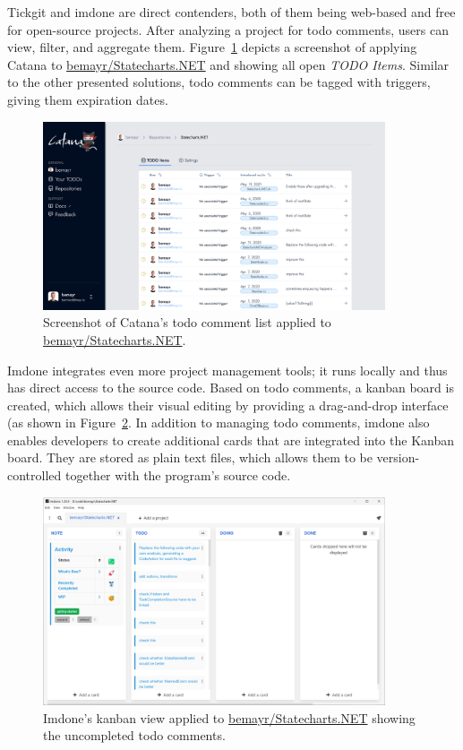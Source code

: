 Tickgit and imdone are direct contenders, both of them being web-based and free for open-source projects.
After analyzing a project for todo comments, users can view, filter, and aggregate them.
Figure~\ref{fig:catana} depicts a screenshot of applying Catana to \href{https://github.com/bemayr/Statecharts.NET}{bemayr/Statecharts.NET} and showing all open \emph{TODO Items}.
Similar to the other presented solutions, todo comments can be tagged with triggers, giving them expiration dates.
%
\begin{figure}
    \centering
    \includegraphics[width=0.9\textwidth]{images/catana}
    \caption{Screenshot of Catana's todo comment list applied to \href{https://github.com/bemayr/Statecharts.NET}{bemayr/Statecharts.NET}.}
    \label{fig:catana}
\end{figure}

Imdone integrates even more project management tools; it runs locally and thus has direct access to the source code.
Based on todo comments, a kanban board is created, which allows their visual editing by providing a drag-and-drop interface (as shown in Figure~\ref{fig:imdone}.
In addition to managing todo comments, imdone also enables developers to create additional cards that are integrated into the Kanban board.
They are stored as plain text files, which allows them to be version-controlled together with the program's source code.
%
\begin{figure}
    \centering
    \includegraphics[width=0.9\textwidth]{images/imdone}
    \caption{Imdone's kanban view applied to \href{https://github.com/bemayr/Statecharts.NET}{bemayr/Statecharts.NET} showing the uncompleted todo comments.}
    \label{fig:imdone}
\end{figure}

